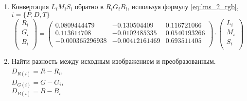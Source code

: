 \documentclass[a4paper,14pt, unknownkeysallowed]{extreport}
\begin{document}
\begin{enumerate}
        \item Конвертация $L_i M_i S_i$ обратно в $R_i G_i B_i$, используя формулу \ref{eq:lms_2_rgb}, $i = \{P, D, T\}$
        \begin{equation}
            \label{eq:lms_2_rgb}
            \begin{pmatrix}
                R_i \\
                G_i \\
                B_i \\
            \end{pmatrix} = 
            \begin{pmatrix}
                0.0809444479 & -0.130504409 & 0.116721066 \\
                0.113614708 & -0.0102485335 & 0.0540193266 \\
                -0.000365296938 & -0.00412161469 & 0.693511405 \\
            \end{pmatrix} \cdot
            \begin{pmatrix}
                L_i\\
                M_i \\
                S_i \\
            \end{pmatrix}
        \end{equation}

        \item Найти разность между исходным изображением и преобразованным.
        $D_{R(i)} = R - R_i$, \\
        $D_{G(i)} = G - G_i$, \\
        $D_{B(i)} = B - B_i$


\end{enumerate}
\end{document}
